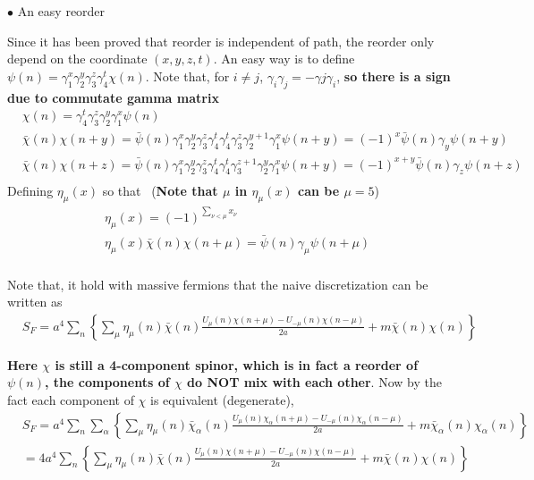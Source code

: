 $\bullet$ An easy reorder

Since it has been proved that reorder is independent of path, the reorder only depend on the coordinate $(x,y,z,t)$. An easy way is to define $\psi (n)=\gamma _1^x\gamma _2^y\gamma _3^z\gamma _4^t \chi (n)$. Note that, for $i\neq j$, $\gamma _i \gamma _j = -\gamma j \gamma _i$, \textbf{so there is a sign due to commutate gamma matrix}
\begin{equation}
\begin{split}
&\chi (n)=\gamma _4^t  \gamma _3^z \gamma _2^y  \gamma _1^x\psi (n)\\
&\bar{\chi}(n) \chi (n+y)= \bar{\psi} (n)\gamma _1^x \gamma _2^y \gamma _3^z \gamma _4^t \gamma _4^t  \gamma _3^z \gamma _2^{y+1}  \gamma _1^x\psi (n + y)=(-1)^x \bar{\psi} (n) \gamma _y \psi (n+y)\\
&\bar{\chi}(n) \chi (n+z)= \bar{\psi} (n)\gamma _1^x \gamma _2^y \gamma _3^z \gamma _4^t \gamma _4^t  \gamma _3^{z+1} \gamma _2^y  \gamma _1^x\psi (n + y)=(-1)^{x+y} \bar{\psi} (n) \gamma _z \psi (n+z)\\
\end{split}
\end{equation}
Defining $\eta_{\mu}(x)$ so that ~(\textbf{Note that $\mu$ in $\eta _{\mu}(x)$ can be $\mu=5$})
\begin{equation}
\begin{split}
&\eta _{\mu}(x) = (-1)^{\sum _{\nu < \mu} x_{\nu}}\\
&\eta _{\mu}(x)\bar{\chi}(n) \chi (n+\mu)= \bar{\psi}(n) \gamma _{\mu} \psi (n+\mu)\\
\end{split}
\end{equation}

Note that, it hold with massive fermions that the naive discretization can be written as
\begin{equation}
\begin{split}
&S_F=a^4\sum _n\left\{\sum _{\mu}\eta _{\mu}(n)\bar{\chi}(n) \frac{U_{\mu}(n) \chi (n+\mu) - U_{-\mu}(n)\chi (n-\mu)}{2a} + m \bar{\chi}(n)\chi (n)\right\}
\end{split}
\end{equation}

\textbf{Here $\chi$ is still a 4-component spinor, which is in fact a reorder of $\psi (n)$, the components of $\chi$ do NOT mix with each other}. Now by the fact each component of $\chi$ is equivalent (degenerate),
\begin{equation}
\begin{split}
&S_F=a^4\sum _n\sum _{\alpha}\left\{\sum _{\mu}\eta _{\mu}(n)\bar{\chi}_{\alpha}(n) \frac{U_{\mu}(n) \chi_{\alpha} (n+\mu) - U_{-\mu}(n)\chi _{\alpha}(n-\mu)}{2a} + m \bar{\chi}_{\alpha}(n)\chi_{\alpha} (n)\right\}\\
&=4a^4\sum _n\left\{\sum _{\mu}\eta _{\mu}(n)\bar{\chi}(n) \frac{U_{\mu}(n) \chi (n+\mu) - U_{-\mu}(n)\chi (n-\mu)}{2a} + m \bar{\chi}(n)\chi (n)\right\}\\
\end{split}
\label{eq.naivestaggeredaction}
\end{equation}

